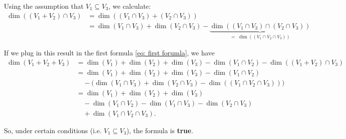 \begin{xrcs}
\begin{xsol}
    Using the assumption that $V_1 \subseteq V_3$, we calculate:
    \begin{equation}
      \begin{aligned}
        \dim ((V_1 + V_2) \cap V_3)
        &= \dim ((V_1 \cap V_3) + (V_2 \cap V_3)) \\
        &= \dim (V_1 \cap V_3) + \dim (V_2 \cap V_3) - \underbrace{\dim ((V_1 \cap V_3) \cap (V_2\cap V_3))}_{= \; \dim ((V_1 \cap V_2 \cap V_3))}
      \end{aligned}
    \end{equation}

    If we plug in this result in the first formula \eqref{eq: first forumla}, we have
    \begin{equation}
      \begin{aligned}
        \dim (V_1 + V_2 + V_3)
        &= \dim (V_1) + \dim (V_2) + \dim (V_3) - \dim (V_1 \cap V_2) - \dim ((V_1 + V_2) \cap V_3) \\
        &= \dim (V_1) + \dim (V_2) + \dim (V_3) - \dim (V_1 \cap V_2) \\
        &\quad - \big(\dim (V_1 \cap V_3) + \dim (V_2 \cap V_3) - \dim ((V_1 \cap V_2 \cap V_3)) \big) \\
        &= \dim (V_1) + \dim (V_2) + \dim (V_3) \\
        & \quad - \dim(V_1 \cap V_2) - \dim (V_1 \cap V_3) - \dim (V_2 \cap V_3) \\
        & \quad + \dim (V_1 \cap V_2 \cap V_3).
      \end{aligned}
    \end{equation}

    So, under certain conditions (i.e. $V_1 \subseteq V_3$), the formula is \textbf{true}.
  \end{xsol}
\end{xrcs}

